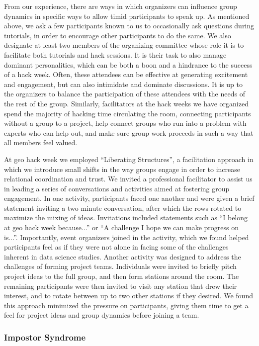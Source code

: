 \documentclass{aastex62}
\begin{document}
From our experience, there are ways in which organizers can influence group dynamics in specific ways to allow timid participants to speak up. As mentioned above, we ask a few participants known to us to occasionally ask questions during tutorials, in order to encourage other participants to do the same. We also designate at least two members of the organizing committee whose role it is to facilitate both tutorials and hack sessions. It is their task to also manage dominant personalities, which can be both a boon and a hindrance to the success of a hack week. Often, these attendees can be effective at generating excitement and engagement, but can also intimidate and dominate discussions. It is up to the organizers to balance the participation of these attendees with the needs of the rest of the group. Similarly, facilitators at the hack weeks we have organized spend the majority of hacking time circulating the room, connecting participants without a group to a project, help connect groups who run into a problem with experts who can help out, and make sure group work proceeds in such a way that all members feel valued.

At geo hack week we employed ``Liberating Structures'', a facilitation approach in which we introduce small shifts in the way groups engage in order to increase relational coordination and trust. We invited a professional facilitator to assist us in leading a series of conversations and activities aimed at fostering group engagement. In one activity, participants faced one another and were given a brief statement inviting a two minute conversation, after which the rows rotated to maximize the mixing of ideas. Invitations included statements such as ``I belong at geo hack week because...'' or ``A challenge I hope we can make progress on is...''. Importantly, event organizers joined in the activity, which we found helped participants feel as if they were not alone in facing some of the challenges inherent in data science studies. Another activity was designed to address the challenges of forming project teams. Individuals were invited to briefly pitch project ideas to the full group, and then form stations around the room. The remaining participants were then invited to visit any station that drew their interest, and to rotate between up to two other stations if they desired. We found this approach minimized the pressure on participants, giving them time to get a feel for project ideas and group dynamics before joining a team.


\subsubsection{Impostor Syndrome}
\end{document}
